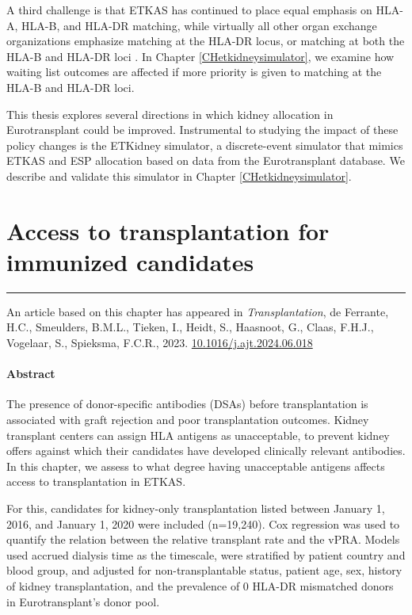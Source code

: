 \documentclass[11pt,twoside,]{book}
\begin{document}
A third challenge is that ETKAS has continued to place equal emphasis on HLA-A,
HLA-B, and HLA-DR matching, while virtually all other organ exchange organizations
emphasize matching at the HLA-DR locus, or matching at both the HLA-B and HLA-DR loci
\citep{Wu2017}. In Chapter \ref{CHetkidneysimulator}, we examine how waiting list
outcomes are affected if more priority is given to matching at the HLA-B
and HLA-DR loci.

This thesis explores several directions in which kidney allocation in
Eurotransplant could be improved. Instrumental to studying the impact of
these policy changes is
the ETKidney simulator, a discrete-event simulator that mimics ETKAS and
ESP allocation based on data from the Eurotransplant database. We describe and validate this simulator
in Chapter \ref{CHetkidneysimulator}.

\chapter{Access to transplantation for immunized candidates}\label{CHvpra}


\vfill

\begin{center}\rule{0.5\linewidth}{0.5pt}\end{center}

\noindent
An article based on this chapter has appeared in \emph{Transplantation}, de Ferrante, H.C., Smeulders, B.M.L., Tieken, I., Heidt, S., Haasnoot, G., Claas, F.H.J., Vogelaar, S., Spieksma, F.C.R., 2023. \href{https://doi.org/10.1097/TP.0000000000004687}{10.1016/j.ajt.2024.06.018} \citep{deferranteImmunizedPatientsFace2023}

\newpage
\normalsize

\subsubsection*{Abstract}

The presence of donor-specific antibodies (DSAs) before
transplantation is associated with graft rejection and poor
transplantation outcomes. Kidney transplant centers can assign HLA
antigens as unacceptable, to prevent kidney offers against which their
candidates have developed clinically relevant antibodies. In this chapter, we assess
to what degree having unacceptable antigens affects access to transplantation
in ETKAS.

For this, candidates for kidney-only transplantation listed
between January 1, 2016, and January 1, 2020 were included (n=19,240).
Cox regression was used to quantify the relation between the relative
transplant rate and the vPRA. Models used accrued dialysis time as
the timescale, were stratified by patient country and blood group, and
adjusted for non-transplantable status, patient age, sex, history of
kidney transplantation, and the prevalence of 0 HLA-DR mismatched donors in
Eurotransplant's donor pool.
\end{document}
